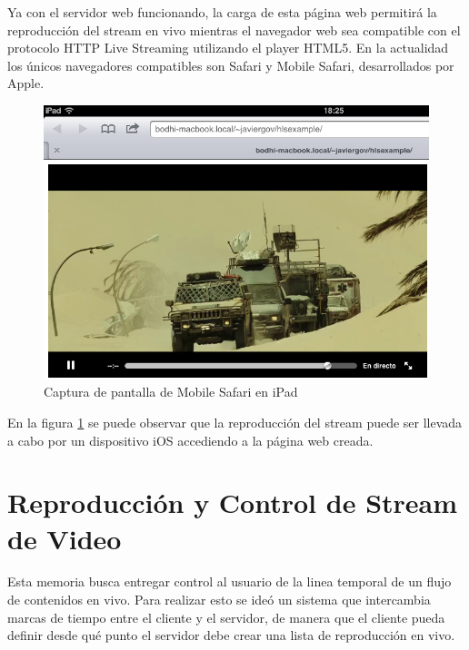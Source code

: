 Ya con el servidor web funcionando, la carga de esta página web permitirá la reproducción del stream en vivo mientras el navegador web sea compatible con el protocolo HTTP Live Streaming utilizando el player HTML5. En la actualidad los únicos navegadores compatibles son Safari y Mobile Safari, desarrollados por Apple.\\
\begin{figure}[H]
	\centering
	\includegraphics[scale=0.6]{imgs/ipad-hlsexample.png}
	\caption{Captura de pantalla de Mobile Safari en iPad}
	\label{ipad-hlsexample}	
\end{figure}

En la figura \ref{ipad-hlsexample} se puede observar que la reproducción del stream puede ser llevada a cabo por un dispositivo iOS accediendo a la página web creada.\\








	
	
\section{Reproducción y Control de Stream de Video}

	Esta memoria busca entregar control al usuario de la linea temporal de un flujo de contenidos en vivo. Para realizar esto se ideó un sistema que intercambia marcas de tiempo entre el cliente y el servidor, de manera que el cliente pueda definir desde qué punto el servidor debe crear una lista de reproducción en vivo. \\
	
